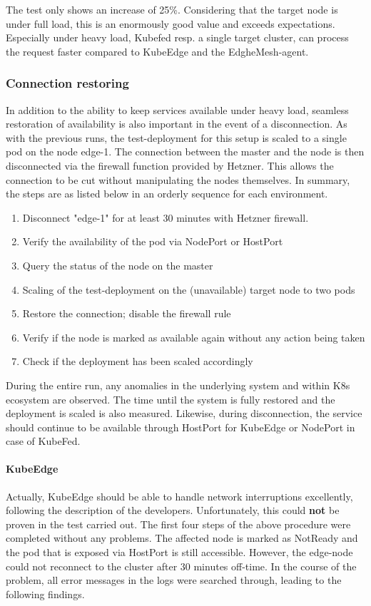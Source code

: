 \documentclass[MSC,Master,english]{twbook}%
\begin{document}
The test only shows an increase of 25\%. Considering that the target node is under full load, this is an enormously good value and exceeds expectations. Especially under heavy load, Kubefed resp. a single target cluster, can process the request faster compared to KubeEdge and the EdgheMesh-agent.

\subsubsection{Connection restoring}
In addition to the ability to keep services available under heavy load, seamless restoration of availability is also important in the event of a disconnection. As with the previous runs, the test-deployment for this setup is scaled to a single pod on the node edge-1. The connection between the master and the node is then disconnected via the firewall function provided by Hetzner. This allows the connection to be cut without manipulating the nodes themselves. In summary, the steps are as listed below in an orderly sequence for each environment.
\begin{enumerate}
    \itemsep0em
    \item Disconnect "edge-1" for at least 30 minutes with Hetzner firewall.
    \item Verify the availability of the pod via NodePort or HostPort
    \item Query the status of the node on the master
    \item Scaling of the test-deployment on the (unavailable) target node to two pods
    \item Restore the connection; disable the firewall rule
    \item Verify if the node is marked as available again without any action being taken
    \item Check if the deployment has been scaled accordingly
\end{enumerate}

During the entire run, any anomalies in the underlying system and within \ac{K8s} ecosystem are observed. The time until the system is fully restored and the deployment is scaled is also measured. Likewise, during disconnection, the service should continue to be available through HostPort for KubeEdge or NodePort in case of KubeFed. 

\paragraph{KubeEdge} Actually, KubeEdge should be able to handle network interruptions excellently, following the description of the developers. Unfortunately, this could \textbf{not} be proven in the test carried out. The first four steps of the above procedure were completed without any problems. The affected node is marked as NotReady and the pod that is exposed via HostPort is still accessible. However, the edge-node could not reconnect to the cluster after 30 minutes off-time. In the course of the problem, all error messages in the logs were searched through, leading to the following findings. \par
\end{document}
